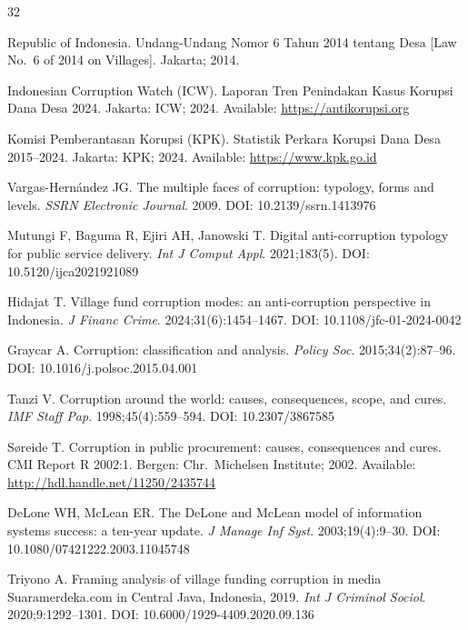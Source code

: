 \documentclass[3p,times,procedia]{elsarticle}
\begin{document}
\begin{thebibliography}{32}

Republic of Indonesia. Undang-Undang Nomor 6 Tahun 2014 tentang Desa [Law No.~6 of 2014 on Villages]. Jakarta; 2014.

Indonesian Corruption Watch (ICW). Laporan Tren Penindakan Kasus Korupsi Dana Desa 2024. Jakarta: ICW; 2024. Available: \url{https://antikorupsi.org}

Komisi Pemberantasan Korupsi (KPK). Statistik Perkara Korupsi Dana Desa 2015--2024. Jakarta: KPK; 2024. Available: \url{https://www.kpk.go.id}

Vargas-Hernández JG. The multiple faces of corruption: typology, forms and levels. \textit{SSRN Electronic Journal}. 2009. DOI: 10.2139/ssrn.1413976

Mutungi F, Baguma R, Ejiri AH, Janowski T. Digital anti-corruption typology for public service delivery. \textit{Int J Comput Appl}. 2021;183(5). DOI: 10.5120/ijca2021921089

Hidajat T. Village fund corruption modes: an anti-corruption perspective in Indonesia. \textit{J Financ Crime}. 2024;31(6):1454--1467. DOI: 10.1108/jfc-01-2024-0042

Graycar A. Corruption: classification and analysis. \textit{Policy Soc}. 2015;34(2):87--96. DOI: 10.1016/j.polsoc.2015.04.001

Tanzi V. Corruption around the world: causes, consequences, scope, and cures. \textit{IMF Staff Pap}. 1998;45(4):559--594. DOI: 10.2307/3867585

S{\o}reide T. Corruption in public procurement: causes, consequences and cures. CMI Report R 2002:1. Bergen: Chr.\ Michelsen Institute; 2002. Available: \url{http://hdl.handle.net/11250/2435744}

DeLone WH, McLean ER. The DeLone and McLean model of information systems success: a ten-year update. \textit{J Manage Inf Syst}. 2003;19(4):9--30. DOI: 10.1080/07421222.2003.11045748

Triyono A. Framing analysis of village funding corruption in media Suaramerdeka.com in Central Java, Indonesia, 2019. \textit{Int J Criminol Sociol}. 2020;9:1292--1301. DOI: 10.6000/1929-4409.2020.09.136


\end{thebibliography}
\end{document}
